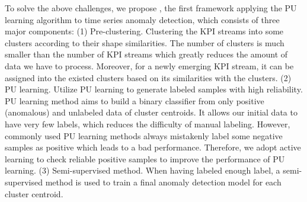 To solve the above challenges, we propose \name{}, the first framework applying the PU learning algorithm to time series anomaly detection,
which consists of three major components:
(1) Pre-clustering. Clustering the KPI streams into some clusters according to their shape similarities. The number of clusters is much smaller than the number of KPI streams which greatly reduces the amount of data we have to process. Moreover, for a newly emerging KPI stream, it can be assigned into the existed clusters based on its similarities with the clusters. 
(2) PU learning. Utilize PU learning to generate labeled samples with high reliability. PU learning method aims to build a binary classifier from only positive (anomalous) and unlabeled data of cluster centroids. 
It allows our initial data to have very few labels, which reduces the difficulty of manual labeling. However, commonly used PU learning methods always mistakenly label some negative samples as positive which leads to a bad performance. Therefore, we adopt active learning to check reliable positive samples to improve the performance of PU learning.
(3) Semi-supervised method. When having labeled enough label, a semi-supervised method is used to train a final anomaly detection model for each cluster centroid.



